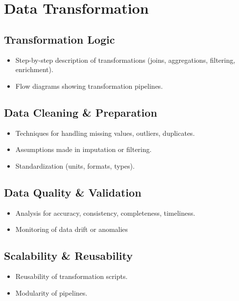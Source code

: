 \cleardoublepage%
\chapter{\label{chap:dt}Data Transformation}%

\section{\label{sec:ds_tl}Transformation Logic}


\begin{itemize}

\item Step-by-step description of transformations (joins, aggregations, filtering, enrichment).
\item Flow diagrams showing transformation pipelines.

\end{itemize}

\section{\label{sec:ds_dc}Data Cleaning \& Preparation}


\begin{itemize}
    \item Techniques for handling missing values, outliers, duplicates.
\item Assumptions made in imputation or filtering.
\item Standardization (units, formats, types).

\end{itemize}


\section{\label{sec:ds_dq}Data Quality \& Validation}


\begin{itemize}
\item Analysis for accuracy, consistency, completeness, timeliness.
\item Monitoring of data drift or anomalies
\end{itemize}


\section{\label{sec:ds_sr}Scalability \& Reusability}


\begin{itemize}
\item Reusability of transformation scripts.
\item Modularity of pipelines.

\end{itemize}